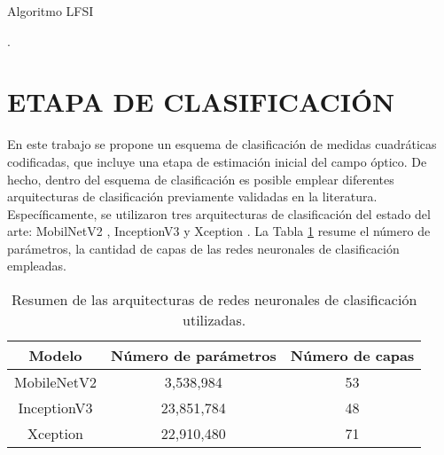\begin{algoritmo}[!h]
    \caption{Algoritmo LFSI }\label{fsi_algo}
    \begin{algorithmic}[1]
		.		
		\EndFor
	\end{algorithmic}
    \label{alg_1}
\end{algoritmo}


\section{ETAPA DE CLASIFICACIÓN}

En este trabajo se propone un esquema de clasificación de medidas cuadráticas codificadas, que incluye una etapa de estimación inicial del campo óptico. De hecho, dentro del esquema de clasificación es posible emplear diferentes arquitecturas de clasificación previamente validadas en la literatura. Específicamente, se utilizaron tres arquitecturas de clasificación del estado del arte: MobilNetV2 , InceptionV3   y Xception . La Tabla \ref{tab:comp_class_models} resume el número de parámetros, la cantidad de capas de las redes neuronales de clasificación empleadas.

\begin{table}[!h]
\centering
\caption{Resumen de las arquitecturas de redes neuronales de clasificación utilizadas.}
\begin{tabular}{|c|c|c|}
\hline
\textbf{Modelo}      & \textbf{Número de parámetros} & \textbf{Número de capas} \\ \hline
MobileNetV2 & 3,538,984            & 53              \\ \hline
InceptionV3 & 23,851,784           & 48              \\ \hline
Xception    & 22,910,480           & 71              \\ \hline
\end{tabular}
\label{tab:comp_class_models}
\end{table}

